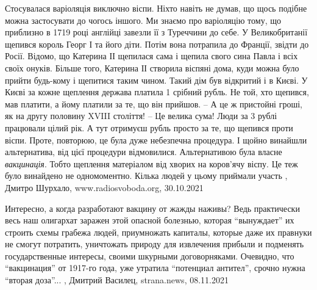 Стосувалася варіоляція виключно віспи. Ніхто навіть не думав, що щось подібне
можна застосувати до чогось іншого. Ми знаємо про варіоляцію тому, що приблизно
в 1719 році англійці завезли її з Туреччини до себе. У Великобританії щепився
король Георг І та його діти. Потім вона потрапила до Франції, звідти до Росії.
Відомо, що Катерина ІІ щепилася сама і щепила свого сина Павла і всіх своїх
онуків. Більше того, Катерина ІІ створила віспяні дома, куди можна було прийти
будь-кому і щепитися таким чином. Такий дім був відкритий і в Києві. У Києві за
кожне щеплення держава платила 1 срібний рубль. Не той, хто щепився, мав
платити, а йому платили за те, що він прийшов.
– А це ж пристойні гроші, як на другу половину XVIII століття!
– Це велика сума! Люди за 3 рублі працювали цілий рік. А тут отримуєш рубль
просто за те, що щепився проти віспи. Проте, повторюю, це була дуже небезпечна
процедура. І щойно винайшли альтернатива, від цієї процедури відмовилися.
Альтернативою була власне \emph{вакцинація}. Тобто щеплення матеріалом від хворих на
коров’ячу віспу. Це теж було винайдено не одномоментно. Кілька людей у цьому
приймали участь
, 
Дмитро Шурхало, www.radiosvoboda.org, 30.10.2021

Интересно, а когда разработают вакцину от жажды наживы?  Ведь практически весь
наш олигархат заражен этой опасной болезнью, которая \enquote{вынуждает} их строить
схемы грабежа людей, приумножать капиталы, которые даже их правнуки не смогут
потратить, уничтожать природу для извлечения прибыли и подменять
государственные интересы, своими шкурными договорняками.  Очевидно, что
\enquote{вакцинация} от 1917-го года, уже утратила \enquote{потенциал антител}, срочно нужна
\enquote{вторая доза}...
, 
Дмитрий Василец, strana.news, 08.11.2021
